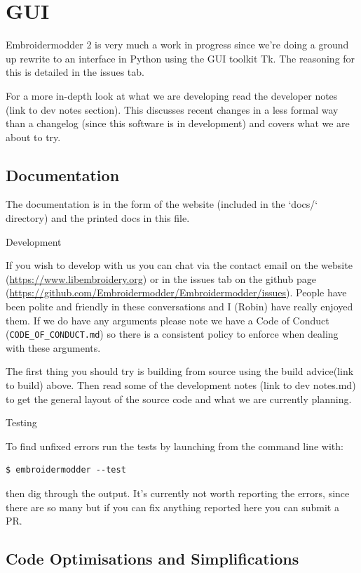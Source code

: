 \documentclass[a4paper]{report}
\begin{document}
\chapter{GUI}

Embroidermodder 2 is very much a work in progress since we're doing a ground
up rewrite to an interface in Python using the GUI toolkit Tk. The reasoning for
this is detailed in the issues tab.

For a more in-depth look at what we are developing read the developer notes (link to dev notes
section). This discusses recent changes in a less formal way than a changelog (since this
software is in development) and covers what we are about to try.

\section{Documentation}

The documentation is in the form of the website
(included in the `docs/` directory) and the printed docs in this file.

Development
~~~~~~~~~~~

If you wish to develop with us you can chat via the contact email on the
website (\url{https://www.libembroidery.org}) or in the issues tab on the
github page (\url{https://github.com/Embroidermodder/Embroidermodder/issues}).
People have been polite and friendly in these conversations and I (Robin) have
really enjoyed them. If we do have any arguments please note we have a Code of
Conduct (\texttt{CODE\_OF\_CONDUCT.md}) so there is a consistent policy to enforce when
dealing with these arguments.

The first thing you should try is building from source using the build advice(link to build)
above. Then read some of the development notes (link to dev notes.md) to get the general
layout of the source code and what we are currently planning.

Testing
~~~~~~~

To find unfixed errors run the tests by launching from the command line with:

\begin{lstlisting}
$ embroidermodder --test
\end{lstlisting}

then dig through the output. It's currently not worth reporting the errors, since
there are so many but if you can fix anything reported here you can submit a PR.

\section{Code Optimisations and Simplifications}
\end{document}

